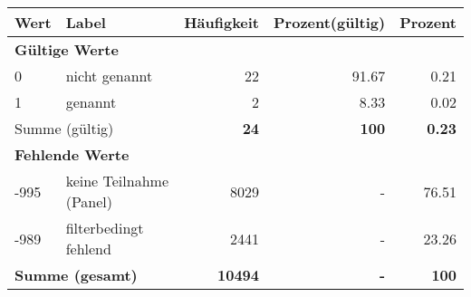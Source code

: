      \begin{longtable}{lXrrr}
     \toprule
     \textbf{Wert} & \textbf{Label} & \textbf{Häufigkeit} & \textbf{Prozent(gültig)} & \textbf{Prozent} \\
     \endhead
     \midrule
     \multicolumn{5}{l}{\textbf{Gültige Werte}}\\

     0 &
     \multicolumn{1}{X}{ nicht genannt   } &


       \num{22} &
       \num[round-mode=places,round-precision=2]{91.67} &
         \num[round-mode=places,round-precision=2]{0.21} \\

     1 &
     \multicolumn{1}{X}{ genannt   } &


       \num{2} &
       \num[round-mode=places,round-precision=2]{8.33} &
         \num[round-mode=places,round-precision=2]{0.02} \\
     \midrule
     \multicolumn{2}{l}{Summe (gültig)} &
       \textbf{\num{24}} &
     \textbf{\num{100}} &
       \textbf{\num[round-mode=places,round-precision=2]{0.23}} \\
     \multicolumn{5}{l}{\textbf{Fehlende Werte}}\\
       -995 &
       keine Teilnahme (Panel) &
         \num{8029} &
        - &
         \num[round-mode=places,round-precision=2]{76.51} \\
       -989 &
       filterbedingt fehlend &
         \num{2441} &
        - &
         \num[round-mode=places,round-precision=2]{23.26} \\
     \midrule
     \multicolumn{2}{l}{\textbf{Summe (gesamt)}} &
          \textbf{\num{10494}} &
        \textbf{-} &
        \textbf{\num{100}} \\
     \bottomrule
     \end{longtable}
     
